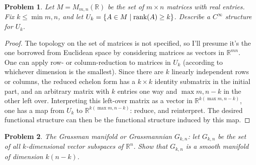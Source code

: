 \documentclass{article}
\newtheorem{plm}{Problem}
\begin{document}
\begin{plm}
  Let $M = M_{m,n}(\mathbb{R})$ be the set of $m \times n$ matrices with real entries.
  Fix $k \leq \min{m,  n}$, and let $U_{k} = \{A \in M \mid \rank(A) \geq k\}$.
  Describe a $C^{\infty}$ structure for $U_{k}$.
\end{plm}

\begin{proof}
  The topology on the set of matrices is not specified, so I'll presume it's the one borrowed from Euclidean space
  by considering matrices as vectors in $\mathbb{R}^{mn}$.
  One can apply row- or column-reduction to matrices in $U_{k}$ (according to whichever dimension is the smallest).
  Since there are $k$ linearly independent rows or columns, the reduced echelon form has a $k \times k$ identity submatrix in the initial part,
  and an arbitrary matrix with $k$ entries one way and $\max{m, n} - k$ in the other left over.
  Interpreting this left-over matrix as a vector in $\mathbb{R}^{k(\max{m, n} - k)}$, one has a map from $U_{k}$ to $\mathbb{R}^{k(\max{m, n} - k)}$:
  reduce, and reinterpret.
  The desired functional structure can then be the functional structure induced by this map.
\end{proof}

\begin{plm}
  The Grassman manifold or Grassmannian $G_{k,n}$: let $G_{k,n}$ be the set of all $k$-dimensional vector subspaces of $\mathbb{R}^{n}$.
  Show that $G_{k,n}$ is a smooth manifold of dimension $k(n - k)$.
\end{plm}
\end{document}

